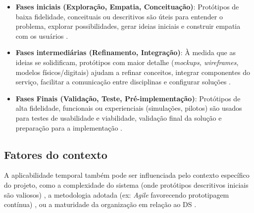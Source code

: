 \begin{itemize}
	\item \textbf{Fases iniciais (Exploração, Empatia, Conceituação)}: Protótipos de baixa fidelidade, conceituais ou descritivos são úteis para entender o problema, explorar possibilidades, gerar ideias iniciais e construir empatia com os usuários \cite{soto2023prototyping, paust2025integrative, mager2023product, lee2023industry, dehmel2021weather, lambe2022capabilities, seko2024transitions}.
	
	\item \textbf{Fases intermediárias (Refinamento, Integração)}: À medida que as ideias se solidificam, protótipos com maior detalhe (\textit{mockups, wireframes}, modelos físicos/digitais) ajudam a refinar conceitos, integrar componentes do serviço, facilitar a comunicação entre disciplinas e configurar soluções \cite{iriarte2023service, nguyen2022human, villa2022integratedcare, Kim2024, milton2021eatingdisorders}.
	
	\item \textbf{Fases Finais (Validação, Teste, Pré-implementação)}: Protótipos de alta fidelidade, funcionais ou experienciais (simulações, pilotos) são usados para testes de usabilidade e viabilidade, validação final da solução e preparação para a implementação \cite{asbjornsen2022echange, villa2022integratedcare, seko2024transitions, yan2022pssvalue}.
\end{itemize}

\subsection{Fatores do contexto}

A aplicabilidade temporal também pode ser influenciada pelo contexto específico do projeto, como a complexidade do sistema (onde protótipos descritivos iniciais são valiosos) \cite{lee2023industry}, a metodologia adotada (ex: \textit{Agile} favorecendo prototipagem contínua) \cite{soto2023prototyping}, ou a maturidade da organização em relação ao DS \cite{soto2023prototyping}.









 
